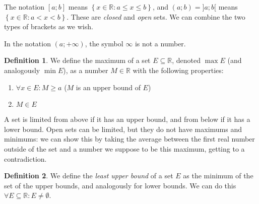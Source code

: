 \documentclass[12pt,a4paper]{report}
\numberwithin{equation}{section}
\theoremstyle{definition}
\newtheorem{definition}{Definition}[section]
\theoremstyle{remark}
\begin{document}
The notation $[a; b]$ means $\left\lbrace x \in \mathbb{R}: a \leq x \leq b\right\rbrace$, and $(a; b) = ]a;b[$ means $\left\lbrace x \in \mathbb{R}: a < x < b\right\rbrace$. These are \emph{closed} and \emph{open} sets. We can combine the two types of brackets as we wish.

In the notation $(a; + \infty )$, the symbol $\infty$ is not a number.

\begin{definition}
We define the maximum of a set $E\subseteq \mathbb{R}$, denoted $\max E$ (and analogously $\min E$), as a number $M \in \mathbb{R}$ with the following properties:
\begin{enumerate}
\item $\forall x \in E: M \geq a$ ($M$ is an upper bound of $E$)
\item $M \in E$
\end{enumerate}
\end{definition}

A set is limited from above if it has an upper bound, and from below if it has a lower bound.
Open sets can be limited, but they do not have maximums and minimums: we can show this by taking the average between the first real number outside of the set and a number we suppose to be this maximum, getting to a contradiction.

\begin{definition}
We define the \emph{least upper bound} of a set $E$ as the minimum of the set of the upper bounds, and analogously for lower bounds. We can do this $\forall E \subseteq \mathbb{R}: E \neq \emptyset$.
\end{definition}

\tableofcontents
\end{document}
